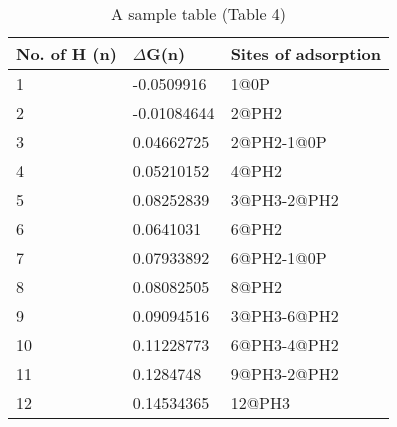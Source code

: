 
\begin{table}[ht]
\centering
\caption{A sample table (Table 4)}
\label{tab:table4}
\begin{tabular}{|l|l|l|}
\hline
No. of H (n) & $\Delta$G(n) & Sites of adsorption \\ \hline
1 & -0.0509916 & 1@0P \\ \hline
2 & -0.01084644 & 2@PH2 \\ \hline
3 & 0.04662725 & 2@PH2-1@0P \\ \hline
4 & 0.05210152 & 4@PH2 \\ \hline
5 & 0.08252839 & 3@PH3-2@PH2 \\ \hline
6 & 0.0641031 & 6@PH2 \\ \hline
7 & 0.07933892 & 6@PH2-1@0P \\ \hline
8 & 0.08082505 & 8@PH2 \\ \hline
9 & 0.09094516 & 3@PH3-6@PH2 \\ \hline
10 & 0.11228773 & 6@PH3-4@PH2 \\ \hline
11 & 0.1284748 & 9@PH3-2@PH2 \\ \hline
12 & 0.14534365 & 12@PH3 \\ \hline

\end{tabular}
\end{table}
